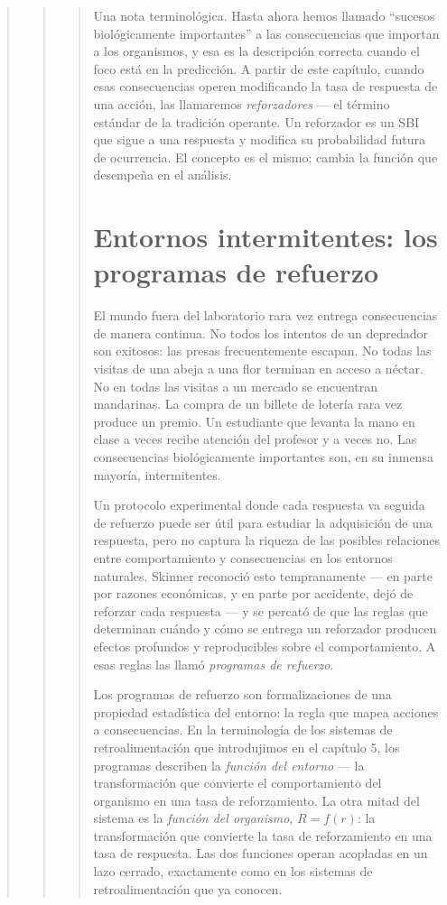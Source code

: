 \documentclass[
  letterpaper,
  DIV=11,
  numbers=noendperiod]{scrreprt}
\begin{document}
\begin{tcolorbox}[enhanced jigsaw, arc=.35mm, bottomrule=.15mm, breakable, colback=white, colframe=quarto-callout-note-color-frame, left=2mm, leftrule=.75mm, opacityback=0, rightrule=.15mm, toprule=.15mm]
\begin{quote}
\begin{quote}
\begin{quote}
Una nota terminológica. Hasta ahora hemos llamado ``sucesos
biológicamente importantes'' a las consecuencias que importan a los
organismos, y esa es la descripción correcta cuando el foco está en la
predicción. A partir de este capítulo, cuando esas consecuencias operen
modificando la tasa de respuesta de una acción, las llamaremos
\emph{reforzadores} --- el término estándar de la tradición operante. Un
reforzador es un SBI que sigue a una respuesta y modifica su
probabilidad futura de ocurrencia. El concepto es el mismo; cambia la
función que desempeña en el análisis.

\mbox{}%
\section{Entornos intermitentes: los programas de
refuerzo}\label{entornos-intermitentes-los-programas-de-refuerzo}

El mundo fuera del laboratorio rara vez entrega consecuencias de manera
continua. No todos los intentos de un depredador son exitosos: las
presas frecuentemente escapan. No todas las visitas de una abeja a una
flor terminan en acceso a néctar. No en todas las visitas a un mercado
se encuentran mandarinas. La compra de un billete de lotería rara vez
produce un premio. Un estudiante que levanta la mano en clase a veces
recibe atención del profesor y a veces no. Las consecuencias
biológicamente importantes son, en su inmensa mayoría, intermitentes.

Un protocolo experimental donde cada respuesta va seguida de refuerzo
puede ser útil para estudiar la adquisición de una respuesta, pero no
captura la riqueza de las posibles relaciones entre comportamiento y
consecuencias en los entornos naturales. Skinner reconoció esto
tempranamente --- en parte por razones económicas, y en parte por
accidente, dejó de reforzar cada respuesta --- y se percató de que las
reglas que determinan cuándo y cómo se entrega un reforzador producen
efectos profundos y reproducibles sobre el comportamiento. A esas reglas
las llamó \emph{programas de refuerzo}.

Los programas de refuerzo son formalizaciones de una propiedad
estadística del entorno: la regla que mapea acciones a consecuencias. En
la terminología de los sistemas de retroalimentación que introdujimos en
el capítulo 5, los programas describen la \emph{función del entorno} ---
la transformación que convierte el comportamiento del organismo en una
tasa de reforzamiento. La otra mitad del sistema es la \emph{función del
organismo}, \(R = f(r)\): la transformación que convierte la tasa de
reforzamiento en una tasa de respuesta. Las dos funciones operan
acopladas en un lazo cerrado, exactamente como en los sistemas de
retroalimentación que ya conocen.


\end{quote}
\end{quote}
\end{quote}
\end{tcolorbox}
\end{document}
